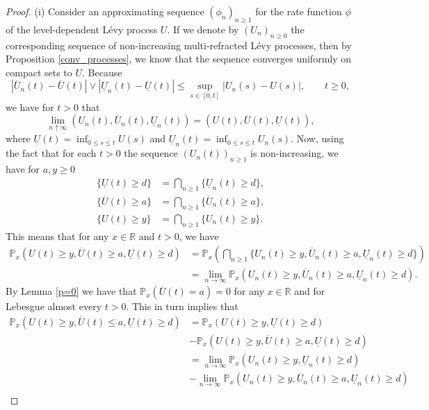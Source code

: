 \documentclass[12pt,reqno]{amsart}
\theoremstyle{definition}
\theoremstyle{remark}
\begin{document}
\begin{proof}
(i) Consider an approximating sequence $(\phi_n)_{n\geq1}$ for the rate function $\phi$ of the level-dependent L\'evy process $U$. If we denote by $(U_n)_{n\geq 0}$ the corresponding sequence of non-increasing 
multi-refracted L\'evy processes, then by Proposition \ref{conv_processes}, we know that the sequence converges uniformly on compact sets to $U$. Because
\[
|\overline{U}_n(t)-\overline{U}(t)|\vee|\underline{U}_n(t)-\underline{U}(t)|\leq \sup_{s\in[0,t]}|U_n(s)-U(s)|, \qquad\text{$t\geq0$},
\]
we have for $t>0$ that 
\[
\lim_{n\uparrow\infty}(U_n(t),\overline{U}_n(t),\underline{U}_n(t))=(U(t),\overline{U}(t),\underline{U}(t)),
\]
where $\underline{U}(t)=\inf_{0\leq s\leq t}U(s)$ and $\underline{U}_n(t)=\inf_{0\leq s\leq t}U_n(s)$.
Now, using the fact that for each $t> 0$ the sequence $(U_n(t))_{n\geq1}$ is non-increasing, we have for $a,y\geq0$
\begin{align*}
\{\underline{U}(t)\geq d \}&=\bigcap_{n\geq 1}\{\underline{U}_n(t)\geq d\},\\
\{\overline{U}(t)\geq a\}&=\bigcap_{n\geq 1}\{\overline{U}_n(t)\geq a\},\\
\{U(t)\geq y\}&=\bigcap_{n\geq 1}\{U_n(t)\geq y\}.
\end{align*}
This means that for any $x\in\mathbb{R}$ and $t>0$, we have
\begin{align*}
\mathbb{P}_x\left(U(t)\geq y, \overline{U}(t)\geq a, \underline{U}(t)\geq d\right)
&=\mathbb{P}_x\left(\bigcap_{n\geq 1}\{U_n(t)\geq y, \overline{U}_n(t)\geq a, \underline{U}_n(t)\geq d\}\right)\\
&=\lim_{n\to\infty}\mathbb{P}_x\left(U_n(t)\geq y, \overline{U}_n(t)\geq a, \underline{U}_n(t)\geq d\right).
\end{align*}
By Lemma \ref{p=0} we have that $\mathbb{P}_x(\overline{U}(t)=a)=0$ for any $x\in\mathbb{R}$ and
for Lebesgue almost every $t>0$. This in turn implies that
\begin{align*}
\mathbb{P}_x\left(U(t)\geq y, \overline{U}(t)\leq a, \underline{U}(t)\geq d \right)&=
\mathbb{P}_x\left(U(t)\geq y,\underline{U}(t)\geq d\right)\\ &-\mathbb{P}_x\left(U(t)\geq y, \overline{U}(t)\geq a, \underline{U}(t)\geq d\right)\\
&=\lim_{n\to\infty}\mathbb{P}_x\left(U_n(t)\geq y,\underline{U}_n(t)\geq d\right)\\ &
-\lim_{n\to\infty} \mathbb{P}_x\left(U_n(t)\geq y, \overline{U}_n(t)\geq a, \underline{U}_n(t)\geq d\right)\\

\end{align*}
\end{proof}
\end{document}
